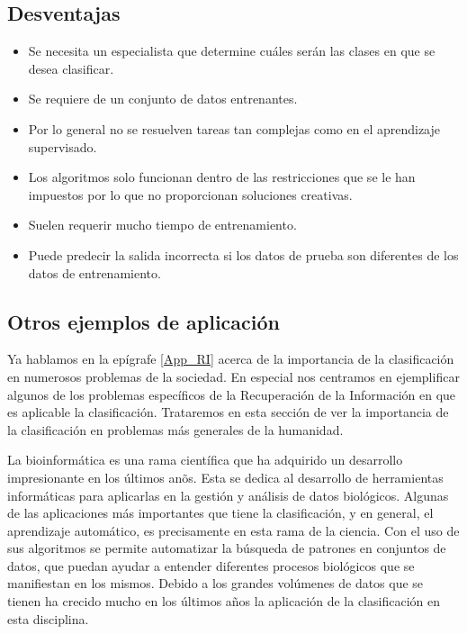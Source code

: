 \documentclass{llncs}
\begin{document}
		\subsection{Desventajas}
				\begin{itemize}
					\item Se necesita un especialista que determine cu\'ales ser\'an las clases en que se desea clasificar.
					\item Se requiere de un conjunto de datos entrenantes.
					\item Por lo general no se resuelven tareas tan complejas como en el aprendizaje supervisado.
					\item Los algoritmos solo funcionan dentro de las restricciones que se le han impuestos por lo que no proporcionan soluciones creativas.
					\item Suelen requerir mucho tiempo de entrenamiento.
					\item Puede predecir la salida incorrecta si los datos de prueba son diferentes de los datos de entrenamiento.
				\end{itemize}

	\subsection{Otros ejemplos de aplicaci\'on}

Ya hablamos en la ep\'igrafe \ref{App_RI} acerca de la importancia de la clasificaci\'on en numerosos problemas de la sociedad. En especial nos centramos en ejemplificar algunos de los problemas espec\'ificos de la Recuperaci\'on de la Informaci\'on en que es aplicable la clasificaci\'on. Trataremos en esta secci\'on de ver la importancia de la clasificaci\'on en problemas m\'as generales de la humanidad.

La bioinform\'atica es una rama cient\'ifica que ha adquirido un desarrollo impresionante en los \'ultimos an\~os. Esta se dedica al desarrollo de herramientas inform\'aticas para aplicarlas en la gesti\'on y an\'alisis de datos biol\'ogicos. Algunas  de las aplicaciones m\'as importantes que tiene la clasificaci\'on, y en general, el aprendizaje autom\'atico, es precisamente en esta rama de la ciencia. Con el uso de sus algoritmos se permite automatizar la b\'usqueda de patrones en conjuntos de datos, que puedan ayudar a entender diferentes procesos biol\'ogicos que se manifiestan en los mismos. Debido a los grandes vol\'umenes de datos que se tienen ha crecido mucho en los \'ultimos a\~nos la aplicaci\'on de la clasificaci\'on en esta disciplina.
\end{document}
